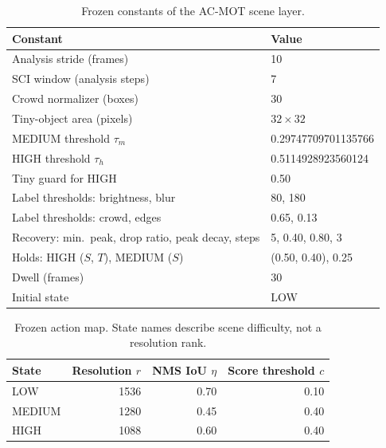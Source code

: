 \begin{table}[t]
\caption{Frozen constants of the AC-MOT scene layer.}
\label{tab:constants}
\centering\footnotesize
\begin{tabular}{@{}p{43mm}l@{}}
\toprule
Constant & Value\\
\midrule
Analysis stride (frames) & 10\\
SCI window (analysis steps) & 7\\
Crowd normalizer (boxes) & 30\\
Tiny-object area (pixels) & $32\times32$\\
MEDIUM threshold $\tau_m$ & 0.29747709701135766\\
HIGH threshold $\tau_h$ & 0.5114928923560124\\
Tiny guard for HIGH & 0.50\\
Label thresholds: brightness, blur & 80, 180\\
Label thresholds: crowd, edges & 0.65, 0.13\\
Recovery: min.\ peak, drop ratio, peak decay, steps & 5, 0.40, 0.80, 3\\
Holds: HIGH ($S$, $T$), MEDIUM ($S$) & (0.50, 0.40), 0.25\\
Dwell (frames) & 30\\
Initial state & LOW\\
\bottomrule
\end{tabular}
\end{table}

\begin{table}[t]
\caption{Frozen action map. State names describe scene difficulty, not a
resolution rank.}
\label{tab:actions}
\centering\footnotesize
\begin{tabular}{@{}lrrr@{}}
\toprule
State & Resolution $r$ & NMS IoU $\eta$ & Score threshold $c$\\
\midrule
LOW & 1536 & 0.70 & 0.10\\
MEDIUM & 1280 & 0.45 & 0.40\\
HIGH & 1088 & 0.60 & 0.40\\
\bottomrule
\end{tabular}
\end{table}
